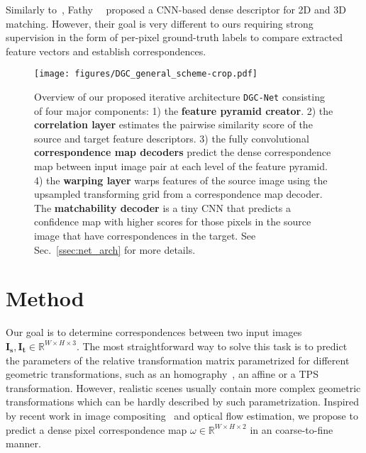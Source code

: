 \documentclass[10pt,twocolumn,letterpaper]{article}
\begin{document}
Similarly to~\cite{UCN}, Fathy~\etal~\cite{Hierarchy2D3DMatching} proposed a CNN-based dense descriptor for 2D and 3D matching. However, their goal is very different to ours requiring strong supervision in the form of per-pixel ground-truth labels to compare extracted feature vectors and establish correspondences. 



\begin{figure*}[t]
  \centering
    \texttt{[image: figures/DGC\_general\_scheme-crop.pdf]}
  \caption{Overview of our proposed iterative architecture \texttt{DGC-Net} consisting of four major components: 1) the \textbf{feature pyramid creator}. 2) the \textbf{correlation layer} estimates the pairwise similarity score of the source and target feature descriptors. 3) the fully convolutional \textbf{correspondence map decoders} predict the dense correspondence map between input image pair at each level of the feature pyramid. 4) the \textbf{warping layer} warps features of the source image using the upsampled transforming grid from a correspondence map decoder. The \textbf{matchability decoder} is a tiny CNN that predicts a confidence map with higher scores for those pixels in the source image that have correspondences in the target. See Sec.~\ref{ssec:net_arch} for more details.}
 \label{fig:f_pipeline}
 \vspace{-2mm}
\end{figure*}

\vspace{-2mm}
\section{Method}\label{sec:method}
\vspace{-2mm}


Our goal is to determine correspondences between two input images $\mathbf{I_s}, \mathbf{I_t} \in \mathbb{R}^{W\times H\times 3}$. The most straightforward way to solve this task is to predict the parameters of the relative transformation matrix parametrized for different geometric transformations, such as an homography~\cite{DeepHomography}, an affine  or a TPS~\cite{Rocco17} transformation. However, realistic scenes usually contain more complex geometric transformations which can be hardly described by such parametrization. Inspired by recent work in image compositing~\cite{st-gan} and optical flow estimation, we propose to predict a dense pixel correspondence map $\omega \in \mathbb{R}^{W\times H\times 2}$ in an coarse-to-fine manner.
\end{document}
